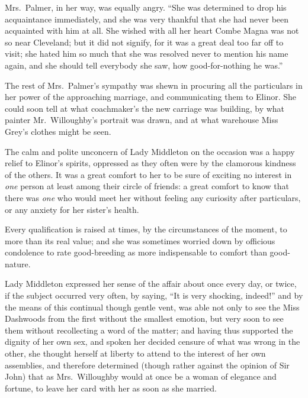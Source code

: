 Mrs.\ Palmer, in her way, was equally angry.
``She was determined to drop his acquaintance immediately,
and she was very thankful that she had never been acquainted
with him at all.  She wished with all her heart Combe
Magna was not so near Cleveland; but it did not signify,
for it was a great deal too far off to visit; she hated
him so much that she was resolved never to mention
his name again, and she should tell everybody she saw,
how good-for-nothing he was.''

The rest of Mrs.\ Palmer's sympathy was shewn in procuring
all the particulars in her power of the approaching marriage,
and communicating them to Elinor.  She could soon tell
at what coachmaker's the new carriage was building,
by what painter Mr.\ Willoughby's portrait was drawn,
and at what warehouse Miss Grey's clothes might be seen.

The calm and polite unconcern of Lady Middleton
on the occasion was a happy relief to Elinor's spirits,
oppressed as they often were by the clamorous kindness
of the others.  It was a great comfort to her to be sure
of exciting no interest in \emph{one} person at least among their
circle of friends: a great comfort to know that there
was \emph{one} who would meet her without feeling any curiosity
after particulars, or any anxiety for her sister's health.

Every qualification is raised at times, by the
circumstances of the moment, to more than its real value;
and she was sometimes worried down by officious condolence
to rate good-breeding as more indispensable to comfort
than good-nature.

Lady Middleton expressed her sense of the affair
about once every day, or twice, if the subject occurred
very often, by saying, ``It is very shocking, indeed!''
and by the means of this continual though gentle vent,
was able not only to see the Miss Dashwoods from the
first without the smallest emotion, but very soon
to see them without recollecting a word of the matter;
and having thus supported the dignity of her own sex,
and spoken her decided censure of what was wrong
in the other, she thought herself at liberty to attend
to the interest of her own assemblies, and therefore
determined (though rather against the opinion of Sir John)
that as Mrs.\ Willoughby would at once be a woman of elegance
and fortune, to leave her card with her as soon as she married.

